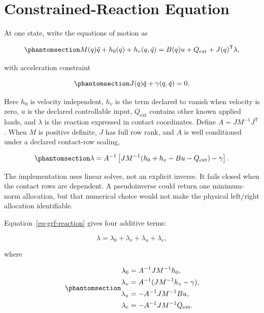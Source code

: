 \documentclass[
  letterpaper,
]{report}
\begin{document}
\section{Constrained-Reaction
Equation}\label{constrained-reaction-equation}

At one state, write the equations of motion as

\begin{equation}\phantomsection\label{eq-grf-eom}{
M(q)\ddot q+h_0(q)+h_v(q,\dot q)
=B(q)u+Q_{\mathrm{ext}}+J(q)^\mathsf{T}\lambda,
}\end{equation}

with acceleration constraint

\begin{equation}\phantomsection\label{eq-grf-constraint}{
J(q)\ddot q+\gamma(q,\dot q)=0.
}\end{equation}

Here \(h_0\) is velocity independent, \(h_v\) is the term declared to
vanish when velocity is zero, \(u\) is the declared controllable input,
\(Q_{\mathrm{ext}}\) contains other known applied loads, and \(\lambda\)
is the reaction expressed in contact coordinates. Define
\(A=JM^{-1}J^\mathsf{T}\). When \(M\) is positive definite, \(J\) has
full row rank, and \(A\) is well conditioned under a declared
contact-row scaling,

\begin{equation}\phantomsection\label{eq-grf-reaction}{
\lambda=A^{-1}\left[
JM^{-1}(h_0+h_v-Bu-Q_{\mathrm{ext}})-\gamma
\right].
}\end{equation}

The implementation uses linear solves, not an explicit inverse. It fails
closed when the contact rows are dependent. A pseudoinverse could return
one minimum-norm allocation, but that numerical choice would not make
the physical left/right allocation identifiable.

Equation~\ref{eq-grf-reaction} gives four additive terms:

\[
\lambda=\lambda_0+\lambda_v+\lambda_u+\lambda_e,
\]

where

\begin{equation}\phantomsection\label{eq-grf-components}{
\begin{aligned}
\lambda_0 &= A^{-1}JM^{-1}h_0,\\
\lambda_v &= A^{-1}(JM^{-1}h_v-\gamma),\\
\lambda_u &= -A^{-1}JM^{-1}Bu,\\
\lambda_e &= -A^{-1}JM^{-1}Q_{\mathrm{ext}}.
\end{aligned}
}\end{equation}
\end{document}
